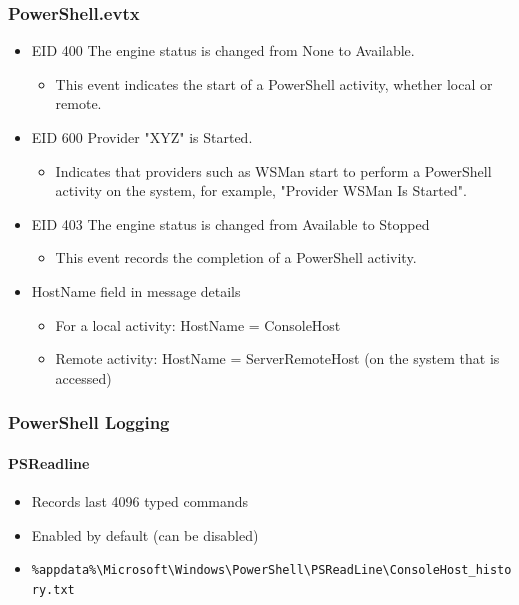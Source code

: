 \subsubsection*{PowerShell.evtx}
\begin{itemize}
    \item EID 400 The engine status is changed from None to Available.
    \begin{itemize}
        \item This event indicates the start of a PowerShell activity, whether local or remote.
    \end{itemize}

    \item EID 600 Provider "XYZ" is Started.
    \begin{itemize}
        \item Indicates that providers such as WSMan start to perform a PowerShell activity on the system, for example, "Provider WSMan Is Started".
    \end{itemize}

    \item EID 403 The engine status is changed from Available to Stopped
    \begin{itemize}
        \item This event records the completion of a PowerShell activity.
    \end{itemize}

    \item HostName field in message details
    \begin{itemize}
        \item For a local activity: HostName = ConsoleHost
        \item Remote activity: HostName = ServerRemoteHost (on the system that is accessed)
    \end{itemize}
\end{itemize}

\subsubsection*{PowerShell Logging}

\paragraph*{PSReadline}
\begin{itemize}
    \item Records last 4096 typed commands
    \item Enabled by default (can be disabled)
    \item \verb|%appdata%\Microsoft\Windows\PowerShell\PSReadLine\ConsoleHost_history.txt|
\end{itemize}

